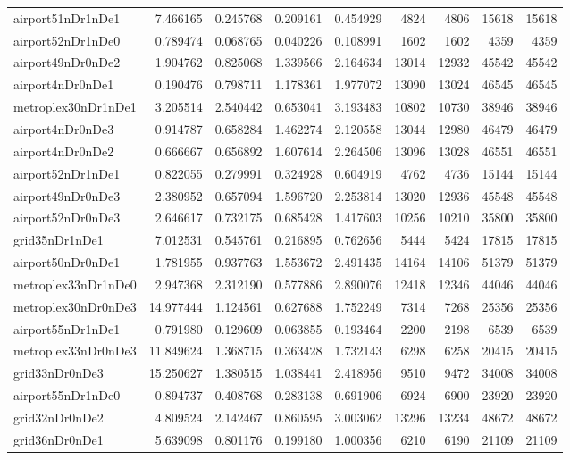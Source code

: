 \begin{longtable}{|l|r|r|r|r|r|r|r|r|}
airport51nDr1nDe1 & 7.466165 & 0.245768 & 0.209161 & 0.454929 & 4824 & 4806 & 15618 & 15618 \\
airport52nDr1nDe0 & 0.789474 & 0.068765 & 0.040226 & 0.108991 & 1602 & 1602 & 4359 & 4359 \\
airport49nDr0nDe2 & 1.904762 & 0.825068 & 1.339566 & 2.164634 & 13014 & 12932 & 45542 & 45542 \\
airport4nDr0nDe1 & 0.190476 & 0.798711 & 1.178361 & 1.977072 & 13090 & 13024 & 46545 & 46545 \\
metroplex30nDr1nDe1 & 3.205514 & 2.540442 & 0.653041 & 3.193483 & 10802 & 10730 & 38946 & 38946 \\
airport4nDr0nDe3 & 0.914787 & 0.658284 & 1.462274 & 2.120558 & 13044 & 12980 & 46479 & 46479 \\
airport4nDr0nDe2 & 0.666667 & 0.656892 & 1.607614 & 2.264506 & 13096 & 13028 & 46551 & 46551 \\
airport52nDr1nDe1 & 0.822055 & 0.279991 & 0.324928 & 0.604919 & 4762 & 4736 & 15144 & 15144 \\
airport49nDr0nDe3 & 2.380952 & 0.657094 & 1.596720 & 2.253814 & 13020 & 12936 & 45548 & 45548 \\
airport52nDr0nDe3 & 2.646617 & 0.732175 & 0.685428 & 1.417603 & 10256 & 10210 & 35800 & 35800 \\
grid35nDr1nDe1 & 7.012531 & 0.545761 & 0.216895 & 0.762656 & 5444 & 5424 & 17815 & 17815 \\
airport50nDr0nDe1 & 1.781955 & 0.937763 & 1.553672 & 2.491435 & 14164 & 14106 & 51379 & 51379 \\
metroplex33nDr1nDe0 & 2.947368 & 2.312190 & 0.577886 & 2.890076 & 12418 & 12346 & 44046 & 44046 \\
metroplex30nDr0nDe3 & 14.977444 & 1.124561 & 0.627688 & 1.752249 & 7314 & 7268 & 25356 & 25356 \\
airport55nDr1nDe1 & 0.791980 & 0.129609 & 0.063855 & 0.193464 & 2200 & 2198 & 6539 & 6539 \\
metroplex33nDr0nDe3 & 11.849624 & 1.368715 & 0.363428 & 1.732143 & 6298 & 6258 & 20415 & 20415 \\
grid33nDr0nDe3 & 15.250627 & 1.380515 & 1.038441 & 2.418956 & 9510 & 9472 & 34008 & 34008 \\
airport55nDr1nDe0 & 0.894737 & 0.408768 & 0.283138 & 0.691906 & 6924 & 6900 & 23920 & 23920 \\
grid32nDr0nDe2 & 4.809524 & 2.142467 & 0.860595 & 3.003062 & 13296 & 13234 & 48672 & 48672 \\
grid36nDr0nDe1 & 5.639098 & 0.801176 & 0.199180 & 1.000356 & 6210 & 6190 & 21109 & 21109 \\

\end{longtable}
